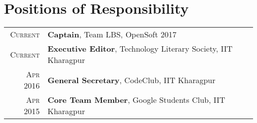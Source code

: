 \documentclass[a4paper,10pt]{extarticle} %
\begin{document}

\section{Positions of Responsibility}

\begin{tabular}{r|p{15cm}}
\textsc{Current} & \textbf{Captain}, Team LBS, OpenSoft 2017\\
\textsc{Current} & \textbf{Executive Editor}, Technology Literary Society, IIT Kharagpur \\
\textsc{Apr 2016} & \textbf{General Secretary}, CodeClub, IIT Kharagpur \\
\textsc{Apr 2015} & \textbf{Core Team Member}, Google Students Club, IIT Kharagpur
\end{tabular}

\end{document}
